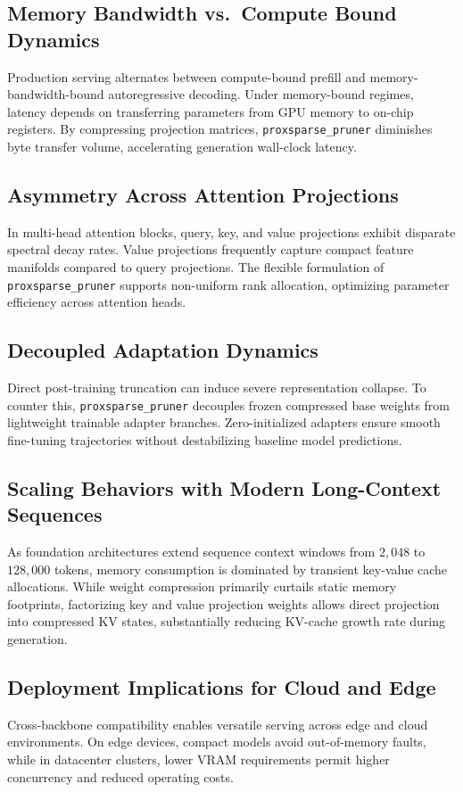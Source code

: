 \subsection{Memory Bandwidth vs.\ Compute Bound Dynamics}
Production serving alternates between compute-bound prefill and memory-bandwidth-bound autoregressive decoding. Under memory-bound regimes, latency depends on transferring parameters from GPU memory to on-chip registers. By compressing projection matrices, \texttt{proxsparse\_pruner} diminishes byte transfer volume, accelerating generation wall-clock latency.

\subsection{Asymmetry Across Attention Projections}
In multi-head attention blocks, query, key, and value projections exhibit disparate spectral decay rates. Value projections frequently capture compact feature manifolds compared to query projections. The flexible formulation of \texttt{proxsparse\_pruner} supports non-uniform rank allocation, optimizing parameter efficiency across attention heads.

\subsection{Decoupled Adaptation Dynamics}
Direct post-training truncation can induce severe representation collapse. To counter this, \texttt{proxsparse\_pruner} decouples frozen compressed base weights from lightweight trainable adapter branches. Zero-initialized adapters ensure smooth fine-tuning trajectories without destabilizing baseline model predictions.

\subsection{Scaling Behaviors with Modern Long-Context Sequences}
As foundation architectures extend sequence context windows from $2{,}048$ to $128{,}000$ tokens, memory consumption is dominated by transient key-value cache allocations. While weight compression primarily curtails static memory footprints, factorizing key and value projection weights allows direct projection into compressed KV states, substantially reducing KV-cache growth rate during generation.

\subsection{Deployment Implications for Cloud and Edge}
Cross-backbone compatibility enables versatile serving across edge and cloud environments. On edge devices, compact models avoid out-of-memory faults, while in datacenter clusters, lower VRAM requirements permit higher concurrency and reduced operating costs.

